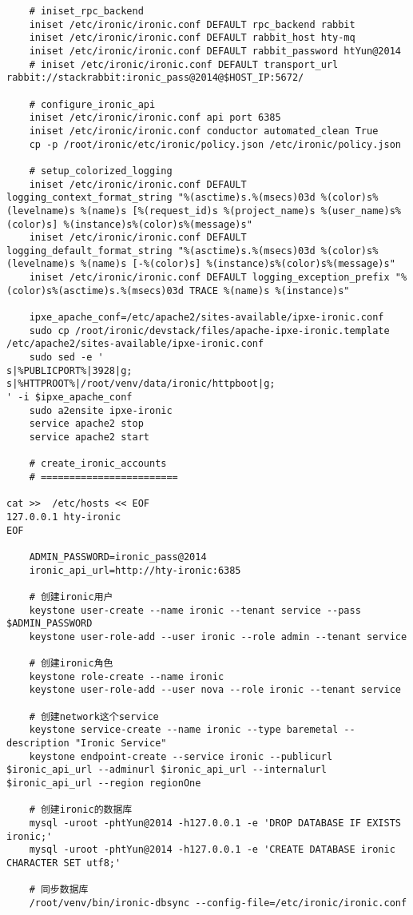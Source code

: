 \documentclass[a4paper,left=2.5cm,right=2.5cm,11pt]{article}
\begin{document}
\begin{lstlisting}
	# iniset_rpc_backend
	iniset /etc/ironic/ironic.conf DEFAULT rpc_backend rabbit
	iniset /etc/ironic/ironic.conf DEFAULT rabbit_host hty-mq
	iniset /etc/ironic/ironic.conf DEFAULT rabbit_password htYun@2014
	# iniset /etc/ironic/ironic.conf DEFAULT transport_url rabbit://stackrabbit:ironic_pass@2014@$HOST_IP:5672/

	# configure_ironic_api
	iniset /etc/ironic/ironic.conf api port 6385
    iniset /etc/ironic/ironic.conf conductor automated_clean True
	cp -p /root/ironic/etc/ironic/policy.json /etc/ironic/policy.json
	
	# setup_colorized_logging
	iniset /etc/ironic/ironic.conf DEFAULT logging_context_format_string "%(asctime)s.%(msecs)03d %(color)s%(levelname)s %(name)s [%(request_id)s %(project_name)s %(user_name)s%(color)s] %(instance)s%(color)s%(message)s"
    iniset /etc/ironic/ironic.conf DEFAULT logging_default_format_string "%(asctime)s.%(msecs)03d %(color)s%(levelname)s %(name)s [-%(color)s] %(instance)s%(color)s%(message)s"
	iniset /etc/ironic/ironic.conf DEFAULT logging_exception_prefix "%(color)s%(asctime)s.%(msecs)03d TRACE %(name)s %(instance)s"

	ipxe_apache_conf=/etc/apache2/sites-available/ipxe-ironic.conf
	sudo cp /root/ironic/devstack/files/apache-ipxe-ironic.template /etc/apache2/sites-available/ipxe-ironic.conf
	sudo sed -e '
s|%PUBLICPORT%|3928|g;
s|%HTTPROOT%|/root/venv/data/ironic/httpboot|g;
' -i $ipxe_apache_conf
	sudo a2ensite ipxe-ironic
	service apache2 stop
	service apache2 start

	# create_ironic_accounts
	# ========================

cat >>  /etc/hosts << EOF
127.0.0.1 hty-ironic
EOF

	ADMIN_PASSWORD=ironic_pass@2014
	ironic_api_url=http://hty-ironic:6385

	# 创建ironic用户
	keystone user-create --name ironic --tenant service --pass $ADMIN_PASSWORD
	keystone user-role-add --user ironic --role admin --tenant service

	# 创建ironic角色
	keystone role-create --name ironic
	keystone user-role-add --user nova --role ironic --tenant service

	# 创建network这个service
	keystone service-create --name ironic --type baremetal --description "Ironic Service"
	keystone endpoint-create --service ironic --publicurl $ironic_api_url --adminurl $ironic_api_url --internalurl $ironic_api_url --region regionOne
	
	# 创建ironic的数据库
	mysql -uroot -phtYun@2014 -h127.0.0.1 -e 'DROP DATABASE IF EXISTS ironic;'
	mysql -uroot -phtYun@2014 -h127.0.0.1 -e 'CREATE DATABASE ironic CHARACTER SET utf8;'
	
	# 同步数据库
	/root/venv/bin/ironic-dbsync --config-file=/etc/ironic/ironic.conf
	\end{lstlisting}
\end{document}
